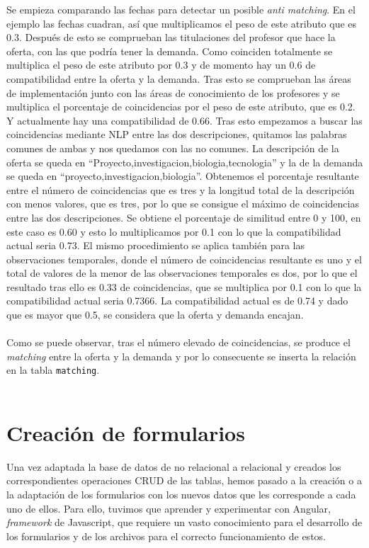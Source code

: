 \documentclass[11pt]{book}
\begin{document}
Se empieza comparando las fechas para detectar un posible \emph{anti matching}. En el ejemplo las fechas cuadran, así que multiplicamos el peso de este atributo que es 0.3. Después de esto se comprueban las titulaciones del profesor que hace la oferta, con las que podría tener la demanda. Como coinciden totalmente se multiplica el peso de este atributo por 0.3 y de momento hay un 0.6 de compatibilidad entre la oferta y la demanda. Tras esto se comprueban las áreas de implementación junto con las áreas de conocimiento de los profesores y se multiplica el porcentaje de coincidencias por el peso de este atributo, que es 0.2. Y actualmente hay una compatibilidad de 0.66. Tras esto empezamos a buscar las coincidencias mediante NLP entre las dos descripciones, quitamos las palabras comunes de ambas y nos quedamos con las no comunes. La descripción de la oferta se queda en “Proyecto,investigacion,biologia,tecnologia” y la de la demanda se queda en “proyecto,investigacion,biologia”. Obtenemos el porcentaje resultante entre el número de coincidencias que es tres y la longitud total de la descripción con menos valores, que es tres, por lo que se consigue el máximo de coincidencias entre las dos descripciones. Se obtiene el porcentaje de similitud entre 0 y 100,  en este caso es 0.60 y esto lo multiplicamos por 0.1 con lo que la compatibilidad actual seria 0.73. El mismo procedimiento se aplica también para las observaciones temporales, donde el número de coincidencias resultante es uno y el total de valores de la menor de las observaciones temporales es dos, por lo que el resultado tras ello es 0.33 de coincidencias, que se multiplica por 0.1 con lo que la compatibilidad actual seria 0.7366. La compatibilidad actual es de 0.74 y dado que es mayor que 0.5, se considera que la oferta y demanda encajan.\\\\
 Como se puede observar, tras el número elevado de coincidencias, se produce el \emph{matching} entre la oferta y la demanda y por lo consecuente se inserta la relación en la tabla \texttt{matching}.\\\\
 
 \chapter{Creación de formularios}\label{cap:formularios}
 Una vez adaptada la base de datos de no relacional a relacional y creados los correspondientes operaciones CRUD de las tablas, hemos pasado a la creación o a la adaptación de los formularios con los nuevos datos que les corresponde a cada uno de ellos. Para ello, tuvimos que aprender y experimentar con Angular, \emph{framework} de Javascript, que requiere un vasto conocimiento para el desarrollo de los formularios y de los archivos para el correcto funcionamiento de estos.
\end{document}
